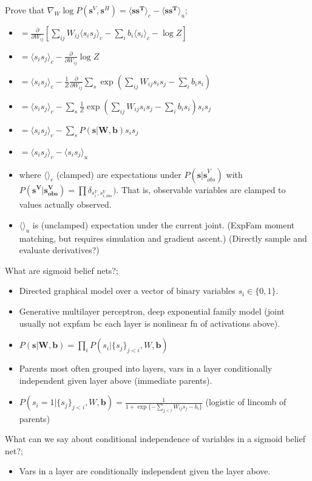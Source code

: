 \documentclass{article}
\begin{document}
Prove that $\nabla_W\log P(\mathbf{s}^V, \mathbf{s}^H)=\langle \mathbf{ss^T} \rangle_c - \langle \mathbf{ss^T} \rangle_u$; \begin{itemize} \item $=\frac{\partial}{\partial W_{ij}}[\sum_{ij}W_{ij}\langle s_is_j\rangle_c -\sum_ib_i\langle s_i\rangle_c- \log Z]$ \item $=\langle s_is_j \rangle_c - \frac{\partial}{\partial W_{ij}}\log Z$ \item $=\langle s_is_j \rangle_c - \frac{1}{Z}\frac{\partial}{\partial W_{ij}}\sum_s \exp(\sum_{ij}W_{ij}s_is_j - \sum_i b_i s_i)$ \item $=\langle s_is_j \rangle_c - \sum_s\frac{1}{Z} \exp(\sum_{ij}W_{ij}s_is_j - \sum_i b_i s_i)s_is_j$ \item $=\langle s_is_j \rangle_c - \sum_sP(\mathbf{s|W, b})s_is_j$ \item $=\langle s_is_j \rangle_c - \langle s_is_j \rangle_u$ \item where $\langle \rangle_c$ (clamped) are expectations under $P(\mathbf{s|s}^V_{obs})$ with $P(\mathbf{s^V|s^V_{obs}})=\prod\delta_{s^V_i, s^V_{i, obs}})$. That is, observable variables are clamped to values actually observed. \item $\langle \rangle_u$ is (unclamped) expectation under the current joint. (ExpFam moment matching, but requires simulation and gradient ascent.) (Directly sample and evaluate derivatives?) \end{itemize}

What are sigmoid belief nets?; \begin{itemize} \item Directed graphical model over a vector of binary variables $s_i\in\{0, 1\}$. \item Generative multilayer perceptron, deep exponential family model (joint usually not expfam bc each layer is nonlinear fn of activations above). \item $P(\mathbf{s|W, b})=\prod_i P(s_i|\{s_j\}_{j<i}, W, \mathbf{b})$ \item Parents most often grouped into layers, vars in a layer conditionally independent given layer above (immediate parents). \item $P(s_i=1|\{s_j\}_{j<i}, W, \mathbf{b})=\frac{1}{1+\exp\{-\sum_{j<i}W_{ij}s_j-b_i\}}$ (logistic of lincomb of parents) \end{itemize}

What can we say about conditional independence of variables in a sigmoid belief net?; \begin{itemize} \item Vars in a layer are conditionally independent given the layer above. \end{itemize}
\end{document}
